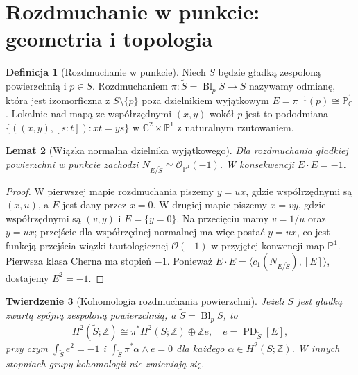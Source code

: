 \documentclass[11pt,a4paper,oneside]{report}
\newcommand{\C}{\mathbb{C}}
\newcommand{\Z}{\mathbb{Z}}
\theoremstyle{plain}
\newtheorem{twierdzenie}{Twierdzenie}[section]
\newtheorem{lemat}[twierdzenie]{Lemat}
\theoremstyle{definition}
\newtheorem{definicja}[twierdzenie]{Definicja}
\theoremstyle{remark}
\begin{document}
\section{Rozdmuchanie w punkcie: geometria i topologia}
\begin{definicja}[Rozdmuchanie w punkcie]
Niech $S$ będzie gładką zespoloną powierzchnią i $p\in S$.
Rozdmuchaniem $\pi:\widetilde S=\operatorname{Bl}_pS\to S$
nazywamy odmianę, która jest izomorficzna z $S\setminus\{p\}$
poza dzielnikiem wyjątkowym $E=\pi^{-1}(p)\cong\mathbb P^1_\C$.
Lokalnie nad mapą ze współrzędnymi $(x,y)$ wokół $p$ jest to
pododmiana $\{((x,y),[s:t]):xt=ys\}$ w
$\C^2\times\mathbb P^1$ z naturalnym rzutowaniem.
\end{definicja}
\begin{lemat}[Wiązka normalna dzielnika wyjątkowego]
\label{lem:xvii-exceptional}
Dla rozdmuchania gładkiej powierzchni w punkcie zachodzi
$N_{E/\widetilde S}\simeq\mathcal O_{\mathbb P^1}(-1)$.
W konsekwencji $E\cdot E=-1$.
\end{lemat}
\begin{proof}
W pierwszej mapie rozdmuchania piszemy $y=ux$,
gdzie współrzędnymi są $(x,u)$, a $E$ jest dany przez $x=0$.
W drugiej mapie piszemy $x=vy$, gdzie współrzędnymi są
$(v,y)$ i $E=\{y=0\}$. Na przecięciu mamy $v=1/u$
oraz $y=ux$; przejście dla współrzędnej normalnej
ma więc postać $y=ux$, co jest funkcją przejścia
wiązki tautologicznej $\mathcal O(-1)$ w przyjętej konwencji
map $\mathbb P^1$. Pierwsza klasa Cherna ma stopień $-1$.
Ponieważ $E\cdot E=\langle c_1(N_{E/\widetilde S}),[E]\rangle$,
dostajemy $E^2=-1$.
\end{proof}
\begin{twierdzenie}[Kohomologia rozdmuchania powierzchni]
\label{thm:xvii-blowup}
Jeżeli $S$ jest gładką zwartą spójną zespoloną powierzchnią,
a $\widetilde S=\operatorname{Bl}_pS$, to
\[
H^2(\widetilde S;\Z)\cong \pi^*H^2(S;\Z)\oplus\Z e,
\quad e=\operatorname{PD}_{\widetilde S}[E],
\]
przy czym $\int_{\widetilde S}e^2=-1$ i
$\int_{\widetilde S}\pi^*\alpha\wedge e=0$
dla każdego $\alpha\in H^2(S;\Z)$.
W innych stopniach grupy kohomologii nie zmieniają się.
\end{twierdzenie}
\end{document}
